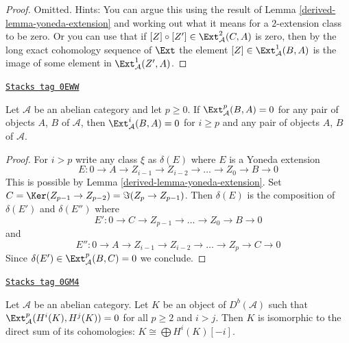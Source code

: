 \begin{proof}

Omitted. Hints: You can argue this using the result of
Lemma \ref{derived-lemma-yoneda-extension} and working
out what it means for a $2$-extension class to be zero.
Or you can use that if $[Z] \circ [Z'] \in \Ext^2_\mathcal{A}(C, A)$
is zero, then by the long exact cohomology sequence
of $\Ext$ the element $[Z] \in \Ext^1_\mathcal{A}(B, A)$ is the
image of some element in $\Ext^1_\mathcal{A}(Z', A)$.
\end{proof}

\begin{lemma}
\label{derived-lemma-higher-ext-zero}
\href{https://stacks.math.columbia.edu/tag/0EWW}{\texttt{Stacks tag 0EWW}}

Let $\mathcal{A}$ be an abelian category and let $p \geq 0$.
If $\Ext^p_\mathcal{A}(B, A) = 0$ for any pair of objects $A$, $B$
of $\mathcal{A}$, then $\Ext^i_\mathcal{A}(B, A) = 0$ for
$i \geq p$ and any pair of objects $A$, $B$ of $\mathcal{A}$.
\end{lemma}

\begin{proof}

For $i > p$ write any class $\xi$ as $\delta(E)$
where $E$ is a Yoneda extension
$$
E : 0 \to A \to Z_{i - 1} \to Z_{i - 2} \to \ldots \to Z_0 \to B \to 0
$$
This is possible by Lemma \ref{derived-lemma-yoneda-extension}.
Set $C = \Ker(Z_{p - 1} \to Z_{p - 2}) = \Im(Z_p \to Z_{p - 1})$.
Then $\delta(E)$ is the composition of $\delta(E')$ and $\delta(E'')$
where
$$
E' : 0 \to C \to Z_{p - 1} \to \ldots \to Z_0 \to B \to 0
$$
and
$$
E'' : 0 \to A \to Z_{i - 1} \to Z_{i - 2} \to \ldots \to Z_p \to C \to 0
$$
Since $\delta(E') \in \Ext^p_\mathcal{A}(B, C) = 0$
we conclude.
\end{proof}

\begin{lemma}
\label{derived-lemma-ext-2-zero-pre}
\href{https://stacks.math.columbia.edu/tag/0GM4}{\texttt{Stacks tag 0GM4}}

Let $\mathcal{A}$ be an abelian category. Let $K$ be an object of
$D^b(\mathcal{A})$ such that $\Ext^p_\mathcal{A}(H^i(K), H^j(K)) = 0$
for all $p \geq 2$ and $i > j$. Then $K$ is isomorphic to the direct
sum of its cohomologies: $K \cong \bigoplus H^i(K)[-i]$.
\end{lemma}

